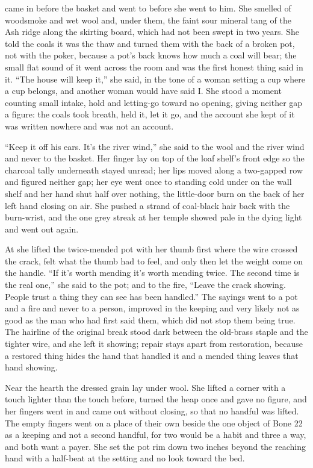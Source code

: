  came in before the basket and went to  before she went to him. She smelled of woodsmoke and wet wool and, under them, the faint sour mineral tang of the Ash ridge along the skirting board, which had not been swept in two years. She told the coals it was the thaw and turned them with the back of a broken pot, not with the poker, because a pot's back knows how much a coal will bear; the small flat sound of it went across the room and was the first honest thing said in it. “The house will keep it,” she said, in the tone of a woman setting a cup where a cup belongs, and another woman would have said I. She stood a moment counting small intake, hold and letting-go toward no opening, giving neither gap a figure: the coals took breath, held it, let it go, and the account she kept of it was written nowhere and was not an account.

“Keep it off his ears. It's the river wind,” she said to the wool and the river wind and never to the basket. Her finger lay on top of the loaf shelf's front edge so the charcoal tally underneath stayed unread; her lips moved along a two-gapped row and figured neither gap; her eye went once to  standing cold under  on the wall shelf and her hand shut half over nothing, the little-door burn on the back of her left hand closing on air. She pushed a strand of coal-black hair back with the burn-wrist, and the one grey streak at her temple showed pale in the dying light and went out again.

At  she lifted the twice-mended pot with her thumb first where the wire crossed the crack, felt what the thumb had to feel, and only then let the weight come on the handle. “If it's worth mending it's worth mending twice. The second time is the real one,” she said to the pot; and to the fire, “Leave the crack showing. People trust a thing they can see has been handled.” The sayings went to a pot and a fire and never to a person, improved in the keeping and very likely not as good as the man who had first said them, which did not stop them being true. The hairline of the original break stood dark between the old-brass staple and the tighter wire, and she left it showing; repair stays apart from restoration, because a restored thing hides the hand that handled it and a mended thing leaves that hand showing.

Near the hearth the dressed grain lay under wool. She lifted a corner with a touch lighter than the touch before, turned the heap once and gave no figure, and her fingers went in and came out without closing, so that no handful was lifted. The empty fingers went on a place of their own beside the one object of Bone 22 as a keeping and not a second handful, for two would be a habit and three a way, and both want a payer. She set the pot rim down two inches beyond the reaching hand with a half-beat at the setting and no look toward the bed.

